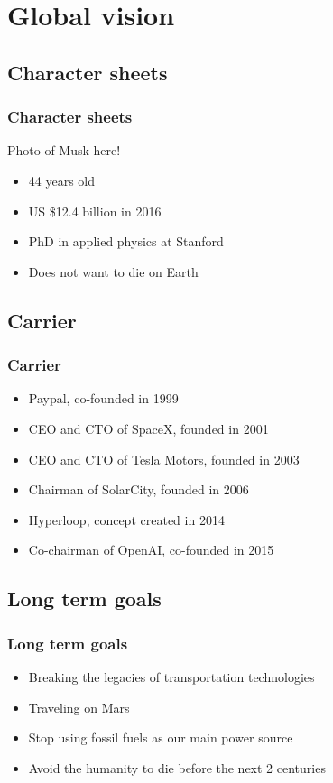    \section{Global vision}

\subsection{Character sheets}
\begin{frame}
\frametitle{Character sheets}
Photo of Musk here!
\begin{itemize}
    \itemsep1em
    \item 44 years old
    \item US \${}12.4 billion in 2016
    \item PhD in applied physics at Stanford
    \item Does not want to die on Earth
\end{itemize}
\end{frame}


\subsection{Carrier}
\begin{frame}
\frametitle{Carrier}
\begin{itemize}
    \itemsep1em
    \item Paypal, co-founded in 1999 %
    \item CEO and CTO of SpaceX, founded in 2001
    \item CEO and CTO of Tesla Motors, founded in 2003
    \item Chairman of SolarCity, founded in 2006
    \item Hyperloop, concept created in 2014
    \item Co-chairman of OpenAI, co-founded in 2015
\end{itemize}
\end{frame}


\subsection{Long term goals}
\begin{frame}
\frametitle{Long term goals}
\begin{itemize}
    \itemsep1em
    \item Breaking the legacies of transportation technologies
    \item Traveling on Mars
    \item Stop using fossil fuels as our main power source
    \item Avoid the humanity to die before the next 2 centuries
\end{itemize}
\end{frame}
